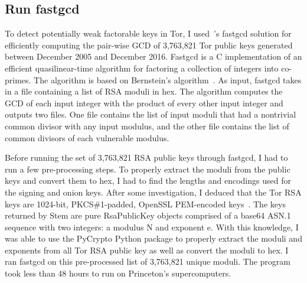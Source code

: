 \subsection{Run fastgcd}
To detect potentially weak factorable keys in Tor, I used~\cite{heninger2012mining}'s fastgcd solution for efficiently computing the pair-wise GCD of 3,763,821 Tor public keys generated between December 2005 and December 2016. Fastgcd is a C implementation of an efficient quasilinear-time algorithm for factoring a collection of integers into co-primes. The algorithm is based on Bernstein's algorithm~\cite{bernstein2004find}. As input, fastgcd takes in a file containing a list of RSA moduli in hex. The algorithm computes the GCD of each input integer with the product of every other input integer and outputs two files. One file contains the list of input moduli that had a nontrivial common divisor with any input modulus, and the other file contains the list of common divisors of each vulnerable modulus. 

Before running the set of 3,763,821 RSA public keys through fastgcd, I had to run a few pre-processing steps. To properly extract the moduli from the public keys and convert them to hex, I had to find the lengths and encodings used for the signing and onion keys. After some investigation, I deduced that the Tor RSA keys are 1024-bit, PKCS\#1-padded, OpenSSL PEM-encoded keys~\cite{torspecbug}. The keys returned by Stem are pure RsaPublicKey objects comprised of a base64 ASN.1 sequence with two integers: a modulus N and exponent e. With this knowledge, I was able to use the PyCrypto Python package to properly extract the moduli and exponents from all Tor RSA public key as well as convert the moduli to hex. I ran fastgcd on this pre-processed list of 3,763,821 unique moduli. The program took less than 48 hours to run on Princeton's supercomputers.
